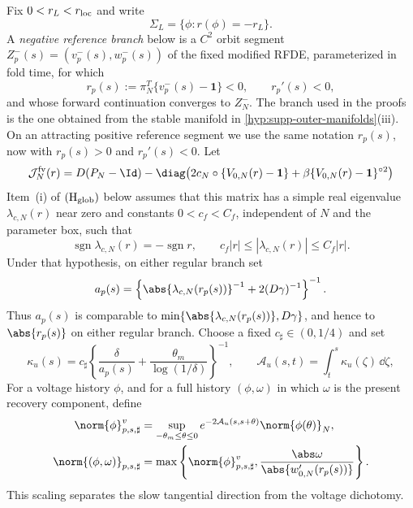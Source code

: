 Fix \(0<r_L<r_{\rm loc}\) and write
\begin{equation}
 \Sigma_L=\{\phi:r(\phi)=-r_L\}.
 \label{eq:supp-negative-regular-section}
\end{equation}
A \emph{negative reference branch} below is a \(C^2\) orbit segment
\(Z_p^-(s)=(v_p^-(s),w_p^-(s))\) of the fixed modified RFDE, parameterized in
fold time, for which
\[
 r_p(s):=\pi_N^T\{v_p^-(s)-\mathbf1\}<0,
 \qquad r_p'(s)<0,
\]
and whose forward continuation converges to \(Z_N^-\).  The branch used in
the proofs is the one obtained from the stable manifold in
\cref{hyp:supp-outer-manifolds}(iii).  On an attracting positive reference
segment we use the same notation \(r_p(s)\), now with \(r_p(s)>0\) and
\(r_p'(s)<0\).  Let
\begin{equation}
 \mathcal J_N^{\rm fv}(r)
 =D(P_N-\Id)-\diag\!\left(
 2c_N\circ\{V_{0,N}(r)-\mathbf1\}
 +\beta\{V_{0,N}(r)-\mathbf1\}^{\circ2}\right)
 \label{eq:supp-frozen-voltage-jacobian}
\end{equation}
Item~\textup{(i)} of \(\mathrm{(H_{\rm glob})}\) below assumes that this
matrix has a simple real eigenvalue \(\lambda_{c,N}(r)\) near zero and
constants \(0<c_f<C_f\), independent of \(N\) and the parameter box, such
that
\[
 \operatorname{sgn}\lambda_{c,N}(r)=-\operatorname{sgn}r,
 \qquad c_f|r|\le|\lambda_{c,N}(r)|\le C_f|r|.
\]
Under that hypothesis, on either regular branch set
\begin{equation}
 a_p(s)=\left\{\abs{\lambda_{c,N}(r_p(s))}^{-1}
                    +2(D\gamma)^{-1}\right\}^{-1}.
 \label{eq:supp-capped-voltage-rate}
\end{equation}
Thus \(a_p(s)\) is comparable to
\(\min\{\abs{\lambda_{c,N}(r_p(s))},D\gamma\}\), and hence to
\(\abs{r_p(s)}\) on either regular branch.  Choose a fixed
\(c_\sharp\in(0,1/4)\) and
set
\begin{equation}
 \kappa_u(s)=c_\sharp
 \left\{\frac{\delta}{a_p(s)}
       +\frac{\theta_m}{\log(1/\delta)}\right\}^{-1},
 \qquad
 \mathcal A_u(s,t)=\int_t^s\kappa_u(\zeta)\,\dd\zeta,
 \label{eq:supp-dichotomy-action}
\end{equation}
For a voltage history \(\phi\), and for a full history
\((\phi,\omega)\) in which \(\omega\) is the present recovery component,
define
\begin{align}
 \norm{\phi}_{p,s,\sharp}^{v}
 &=\sup_{-\theta_m\le\theta\le0}
   e^{-2\mathcal A_u(s,s+\theta)}\norm{\phi(\theta)}_N,\notag\\
 \norm{(\phi,\omega)}_{p,s,\sharp}
 &=\max\left\{\norm{\phi}_{p,s,\sharp}^{v},
       \frac{\abs\omega}{\abs{w_{0,N}'(r_p(s))}}\right\}.
 \label{eq:supp-fading-history-norm}
\end{align}
This scaling separates the slow tangential direction from the voltage
dichotomy.

